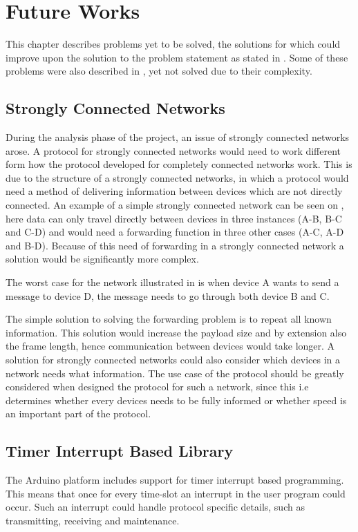 \chapter{Future Works}
This chapter describes problems yet to be solved, the solutions for which could improve upon the solution to the problem statement as stated in . 
Some of these problems were also described in , yet not solved due to their complexity.

\section{Strongly Connected Networks}
During the analysis phase of the project, an issue of strongly connected networks arose.
A protocol for strongly connected networks would need to work different form how the protocol developed for completely connected networks work.
This is due to the structure of a strongly connected networks, in which a protocol would need a method of delivering information between devices which are not directly connected.
An example of a simple strongly connected network can be seen on , here data can only travel directly between devices in three instances  (A-B, B-C and C-D) and would need a forwarding function in three other cases (A-C, A-D and B-D). 
Because of this need of forwarding in a strongly connected network a solution would be significantly more complex.

\noindent
The worst case for the network illustrated in  is when device A wants to send a message to device D, the message needs to go through both device B and C.

The simple solution to solving the forwarding problem is to repeat all known information.
This solution would increase the payload size and by extension also the frame length, hence communication between devices would take longer.
A solution for strongly connected networks could also consider which devices in a network needs what information.
The use case of the protocol should be greatly considered when designed the protocol for such a network, since this i.e determines whether every devices needs to be fully informed or whether speed is an important part of the protocol.

\section{Timer Interrupt Based Library}
The Arduino platform includes support for timer interrupt based programming.
This means that once for every time-slot an interrupt in the user program could occur.
Such an interrupt could handle protocol specific details, such as transmitting, receiving and maintenance.

